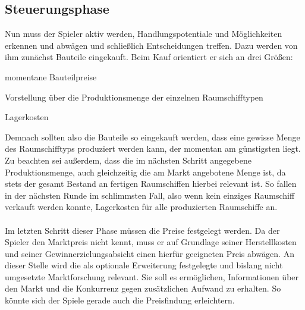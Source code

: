 \subsection{Steuerungsphase}
\label{sub:spielwelt-regeln-steuerungsphase}


Nun muss der Spieler aktiv werden, Handlungspotentiale und Möglichkeiten erkennen und abwägen und schließlich Entscheidungen treffen. Dazu werden von ihm zunächst Bauteile eingekauft. Beim Kauf orientiert er sich an drei Größen: 

\begin{seList}
\item momentane Bauteilpreise
\item Vorstellung über die Produktionsmenge der einzelnen Raumschifftypen
\item Lagerkosten 
\end{seList}

Demnach sollten also die Bauteile so eingekauft werden, dass eine gewisse Menge des Raumschifftyps produziert werden kann, der momentan am günstigsten liegt. Zu beachten sei außerdem, dass die im nächsten Schritt angegebene Produktionsmenge, auch gleichzeitig die am Markt angebotene Menge ist, da stets der gesamt Bestand an fertigen Raumschiffen hierbei relevant ist. So fallen in der nächsten Runde im schlimmsten Fall, also wenn kein einziges Raumschiff verkauft werden konnte, Lagerkosten für alle produzierten Raumschiffe an.  
\\
\\
Im letzten Schritt dieser Phase müssen die Preise festgelegt werden. Da der Spieler den Marktpreis nicht kennt, muss er auf Grundlage seiner Herstellkosten und seiner Gewinnerzielungsabsicht einen hierfür geeigneten Preis abwägen. An dieser Stelle wird die als optionale Erweiterung festgelegte und bislang nicht umgesetzte Marktforschung relevant.  Sie soll es ermöglichen, Informationen über den Markt und die Konkurrenz gegen zusätzlichen Aufwand zu erhalten. So könnte sich der Spiele gerade auch die Preisfindung erleichtern. 






